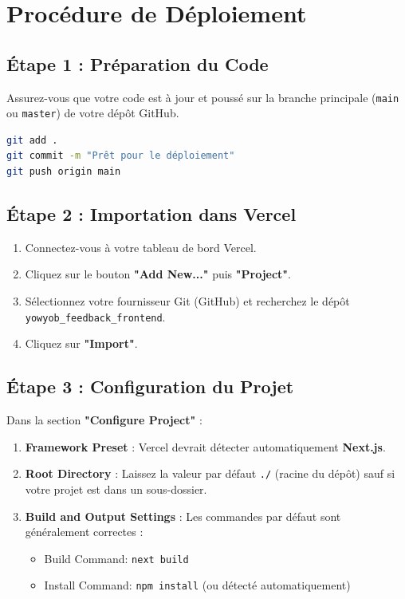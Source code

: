 \documentclass[a4paper,12pt]{article}
\begin{document}
\section{Procédure de Déploiement}

\subsection{Étape 1 : Préparation du Code}
Assurez-vous que votre code est à jour et poussé sur la branche principale (\texttt{main} ou \texttt{master}) de votre dépôt GitHub.
\begin{lstlisting}[language=bash]
git add .
git commit -m "Prêt pour le déploiement"
git push origin main
\end{lstlisting}

\subsection{Étape 2 : Importation dans Vercel}
\begin{enumerate}
    \item Connectez-vous à votre tableau de bord Vercel.
    \item Cliquez sur le bouton \textbf{"Add New..."} puis \textbf{"Project"}.
    \item Sélectionnez votre fournisseur Git (GitHub) et recherchez le dépôt \texttt{yowyob\_feedback\_frontend}.
    \item Cliquez sur \textbf{"Import"}.
\end{enumerate}

\subsection{Étape 3 : Configuration du Projet}
Dans la section \textbf{"Configure Project"} :
\begin{enumerate}
    \item \textbf{Framework Preset} : Vercel devrait détecter automatiquement \textbf{Next.js}.
    \item \textbf{Root Directory} : Laissez la valeur par défaut \texttt{./} (racine du dépôt) sauf si votre projet est dans un sous-dossier.
    \item \textbf{Build and Output Settings} : Les commandes par défaut sont généralement correctes :
    \begin{itemize}
        \item Build Command: \texttt{next build}
        \item Install Command: \texttt{npm install} (ou détecté automatiquement)
    \end{itemize}
\end{enumerate}
\end{document}
